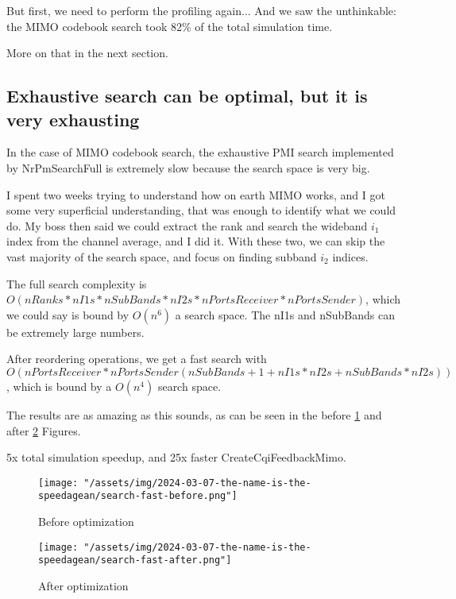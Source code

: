 \documentclass{article}
\begin{document}
But first, we need to perform the profiling again... And we saw the unthinkable:
the MIMO codebook search took 82\% of the total simulation time.

More on that in the next section.

\subsection{Exhaustive search can be optimal, but it is very exhausting}

In the case of MIMO codebook search, the exhaustive PMI search implemented
by NrPmSearchFull is extremely slow because the search space is very big.

I spent two weeks trying to understand how on earth MIMO works, and I got
some very superficial understanding, that was enough to identify what we
could do. My boss then said we could extract the rank and search the
wideband $i_1$ index from the channel average, and I did it. With these
two, we can skip the vast majority of the search space, and focus on finding
subband $i_2$ indices.

The full search complexity is $O(nRanks*nI1s*nSubBands*nI2s*nPortsReceiver*nPortsSender)$,
which we could say is bound by $O(n^6)$ a search space. The nI1s and nSubBands
can be extremely large numbers.

After reordering operations, we get a fast search with
$O(nPortsReceiver*nPortsSender(nSubBands+1+nI1s*nI2s+nSubBands*nI2s))$,
which is bound by a $O(n^4)$ search space.

The results are as amazing as this sounds, as can be seen in the
before \ref{fig:search-fast-before} and after \ref{fig:search-fast-after} Figures.

5x total simulation speedup, and 25x faster CreateCqiFeedbackMimo.

\begin{figure}
    \texttt{[image: "/assets/img/2024-03-07-the-name-is-the-speedagean/search-fast-before.png"]}
    \caption{Before optimization}
    \label{fig:search-fast-before}
\end{figure}

\begin{figure}
    \texttt{[image: "/assets/img/2024-03-07-the-name-is-the-speedagean/search-fast-after.png"]}
    \caption{After optimization}
    \label{fig:search-fast-after}
\end{figure}
\end{document}
